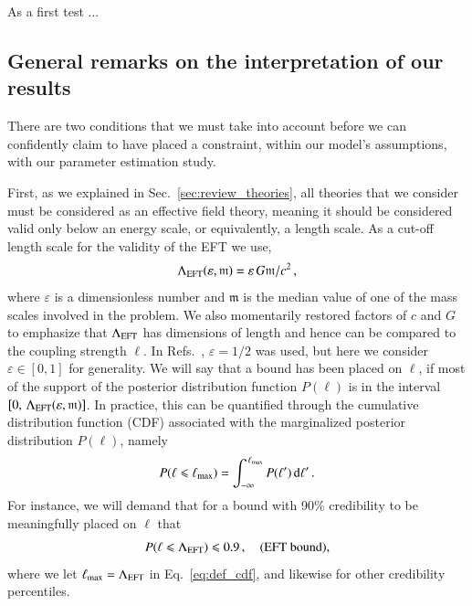 
As a first test ...

\subsection{General remarks on the interpretation of our results}
\label{sec:remarks}

There are two conditions that we must take into account before
we can confidently claim to have placed a constraint, within our model's assumptions,
with our parameter estimation study.

First, as we explained in Sec.~\ref{sec:review_theories}, all theories that we
consider must be considered as an effective field theory, meaning it should be
considered valid only below an energy scale, or equivalently, a length scale.
%
As a cut-off length scale for the validity of the EFT we use,
%
\begin{equation}
\Lambda_{\rm EFT} (\varepsilon, \mathfrak{m}) = \varepsilon \, G \mathfrak{m} / c^2 \,,
\label{eq:def_cutoff}
\end{equation}
%
where $\varepsilon$ is a dimensionless number and $\mathfrak{m}$ is the median
value of one of the mass scales involved in the problem.
%
We also momentarily restored factors of $c$ and $G$ to emphasize that $\Lambda_{\rm EFT}$ has
dimensions of length and hence can be compared to the coupling strength $\ell$.
%
In Refs.~\cite{Nair:2019iur,Perkins:2021mhb,Lyu:2022gdr}, $\varepsilon = 1/2$ was used,
but here we consider $\varepsilon \in [0, 1]$ for generality.
%
We will say that a bound has been placed on $\ell$, if most of the support of
the posterior distribution function $P(\ell)$ is in the interval
$[0, \, \Lambda_{\rm EFT}(\varepsilon, \mathfrak{m})]$.
%
In practice, this can be quantified through the cumulative distribution function
(CDF) associated with the marginalized posterior distribution $P(\ell)$, namely
%
\begin{equation}
P(\ell \leqslant \ell_{\rm max}) = \int_{-\infty}^{\,\ell_{\rm max}} P(\ell') \, {\rm d} \ell'\,.
\label{eq:def_cdf}
\end{equation}
%
For instance, we will demand that for a bound with 90\% credibility to be meaningfully placed on $\ell$ that
%
\begin{equation}
P(\ell \leqslant \Lambda_{\rm EFT}) \leqslant 0.9 \,,
\quad \textrm{(EFT bound)},
\label{eq:eft_bound}
\end{equation}
%
where we let $\ell_{\rm max} = \Lambda_{\rm EFT}$ in Eq.~\eqref{eq:def_cdf}, and
likewise for other credibility percentiles.


